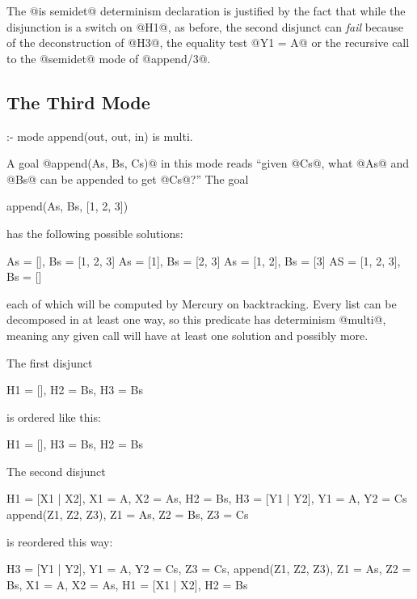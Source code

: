 The @is semidet@ determinism declaration is justified by the fact that
while the disjunction is a switch on @H1@, as before, the second disjunct
can \emph{fail} because of the deconstruction of @H3@, the equality test
@Y1 = A@ or the recursive call to the @semidet@ mode of @append/3@.

\subsection{The Third Mode}

\begin{myverbatim}
:- mode append(out, out, in) is multi.
\end{myverbatim}
A goal @append(As, Bs, Cs)@ in this mode reads ``given @Cs@, what @As@
and @Bs@ can be appended to get @Cs@?''  The goal
\begin{myverbatim}
    append(As, Bs, [1, 2, 3])
\end{myverbatim}
has the following possible solutions:
\begin{myverbatim}
    As = [],        Bs = [1, 2, 3]
    As = [1],       Bs =    [2, 3]
    As = [1, 2],    Bs =       [3]
    AS = [1, 2, 3], Bs =        []
\end{myverbatim}
each of which will be computed by Mercury on backtracking.
Every list can be decomposed in at least one way, so this predicate
has determinism @multi@, meaning any given call will have at least one
solution and possibly more.

The first disjunct
\begin{myverbatim}
    H1 = [],
    H2 = Bs,
    H3 = Bs
\end{myverbatim}
is ordered like this:
\begin{myverbatim}
    H1 = [],            %
    H3 = Bs,            %
    H2 = Bs             %
\end{myverbatim}

The second disjunct
\begin{myverbatim}
    H1 = [X1 | X2],  X1 = A,  X2 = As,
    H2 = Bs,
    H3 = [Y1 | Y2],  Y1 = A,  Y2 = Cs
    append(Z1, Z2, Z3),  Z1 = As,  Z2 = Bs,  Z3 = Cs
\end{myverbatim}
is reordered this way:
\begin{myverbatim}
    H3 = [Y1 | Y2],     %
    Y1 = A,             %
    Y2 = Cs,            %
    Z3 = Cs,            %
    append(Z1, Z2, Z3), %
    Z1 = As,            %
    Z2 = Bs,            %
    X1 = A,             %
    X2 = As,            %
    H1 = [X1 | X2],     %
    H2 = Bs             %
\end{myverbatim}

